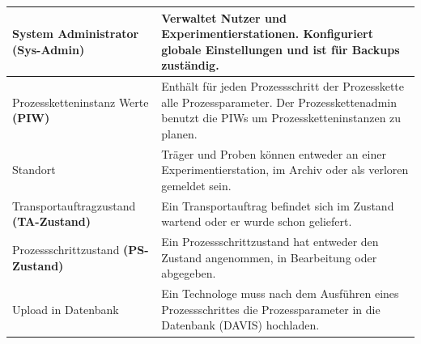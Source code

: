 \documentclass[enabledeprecatedfontcommands,fontsize=12pt,paper=a4,twoside]{scrartcl}
\begin{document}
\begin{longtable}[c]{|p{7cm}|p{8cm}|}
System Administrator \textbf{(Sys-Admin)}      & Verwaltet Nutzer und Experimentierstationen. Konfiguriert globale Einstellungen und ist für Backups zuständig.                                                                                                                                         \\ \hline
Prozessketteninstanz Werte \textbf{(PIW)}      & Enthält für jeden Prozessschritt der Prozesskette alle Prozessparameter. Der Prozesskettenadmin benutzt die PIWs um Prozessketteninstanzen zu planen.                                                                                                 \\ \hline
Standort                                                        & Träger und Proben können entweder an einer Experimentierstation, im Archiv oder als verloren gemeldet sein.                                                                                                                                           \\ \hline
Transportauftragzustand \textbf{(TA-Zustand)}  & Ein Transportauftrag befindet sich im Zustand wartend oder er wurde schon geliefert.                                                                                                                                                                  \\ \hline
Prozessschrittzustand \textbf{(PS-Zustand)}    & Ein Prozessschrittzustand hat entweder den Zustand angenommen, in Bearbeitung oder abgegeben.                                                                                                                                                         \\ \hline
Upload in Datenbank                                             & Ein Technologe muss nach dem Ausführen eines Prozessschrittes die Prozessparameter in die Datenbank (DAVIS) hochladen.                                                                                                                                \\ \hline
\end{longtable}
\end{document}
